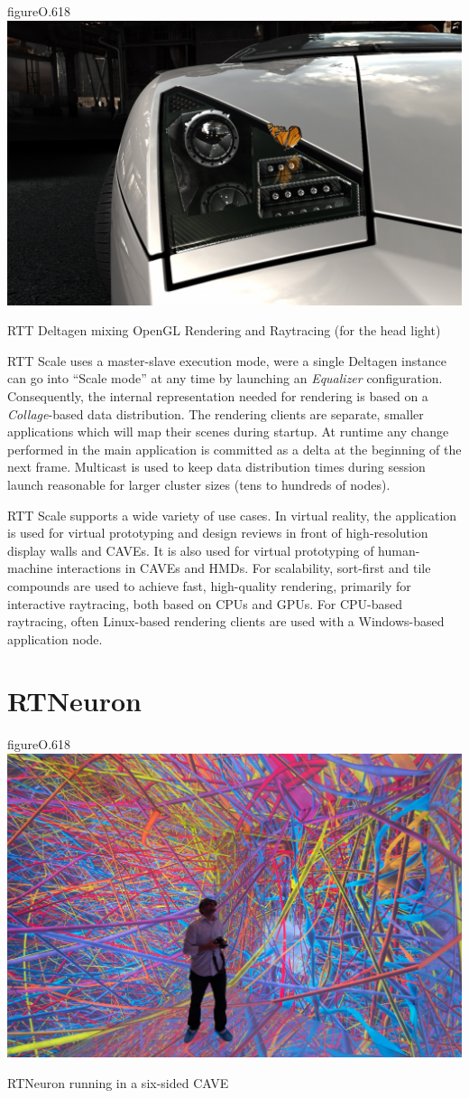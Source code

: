 \begin{wrapfloat}{figure}{O}{.618\textwidth}
  \includegraphics[width=.618\textwidth]{images/DeltaGen}
  {\caption{\label{fDeltaGen}RTT Deltagen mixing OpenGL Rendering and Raytracing (for the head light)}}
\end{wrapfloat}

RTT Scale uses a master-slave execution mode, were a single Deltagen instance
can go into ``Scale mode'' at any time by launching an {\em Equalizer}
configuration. Consequently, the internal representation needed for rendering
is based on a {\em Collage}-based data distribution. The rendering clients
are separate, smaller applications which will map their scenes during startup.
At runtime any change performed in the main application is committed as a
delta at the beginning of the next frame. Multicast is used to keep data
distribution times during session launch reasonable for larger cluster sizes
(tens to hundreds of nodes).

RTT Scale supports a wide variety of use cases. In virtual reality, the
application is used for virtual prototyping and design reviews in front of
high-resolution display walls and CAVEs. It is also used for virtual prototyping of
human-machine interactions in CAVEs and HMDs. For scalability, sort-first and
tile compounds are used to achieve fast, high-quality rendering, primarily for
interactive raytracing, both based on CPUs and GPUs. For CPU-based raytracing,
often Linux-based rendering clients are used with a Windows-based application
node.

\section{RTNeuron}\label{sRTNeuron}

\begin{wrapfloat}{figure}{O}{.618\textwidth}
  \includegraphics[width=.618\textwidth]{images/RTNeuron}
  {\caption{\label{fRTNeuron}RTNeuron running in a six-sided CAVE}}
\end{wrapfloat}


